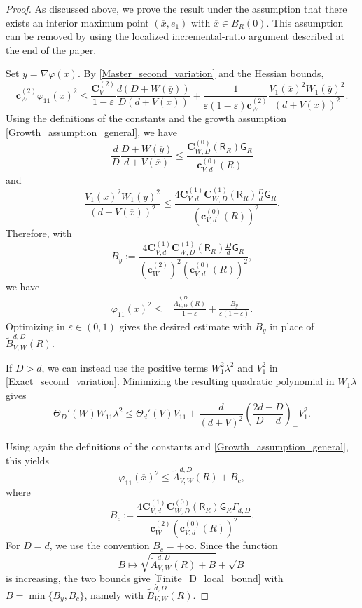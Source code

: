 \documentclass[10pt,a4paper]{amsart}
\newcommand{\CV}{\mathbf{C}_V}
\newcommand{\CVp}[1]{\mathbf{C}_{V,#1}}
\newcommand{\CWp}[1]{\mathbf{C}_{W,#1}}
\newcommand{\ThetaPar}{\Theta}
\newcommand{\cVp}[1]{\mathbf{c}_{V,#1}}
\newcommand{\cW}{\mathbf{c}_W}
\renewcommand{\epsilon}{\varepsilon}
\begin{document}
\begin{proof}
As discussed above, we prove the result under the assumption that there exists an interior  maximum point $(\overline x,e_1)$ with $\overline x\in B_R(0)$. This assumption can be removed by using the localized incremental-ratio argument described at the end of the paper.

Set $\overline y=\nabla\varphi(\overline x)$. By \cref{Master_second_variation} and the Hessian bounds,
\[
\cW^{(2)}\varphi_{11}(\overline x)^2
\le
\frac{\CV^{(2)}}{1-\epsilon}
\frac{d(D+W(\overline y))}{D(d+V(\overline x))} 
+
\frac{1}{\epsilon(1-\epsilon)\cW^{(2)}}
\frac{V_1(\overline x)^2W_1(\overline y)^2}{(d+V(\overline x))^2}.
\]
Using the definitions of the constants and the growth assumption \cref{Growth_assumption_general}, we have
\[
    \frac{d}{D}\frac{D+W(\overline y)}{d+V(\overline x)}
    \le
    \frac{\CWp{D}^{(0)}(\mathsf R_R)\mathsf G_R}{\cVp{d}^{(0)}(R)}
\]
and
\[
    \frac{V_1(\overline x)^2W_1(\overline y)^2}{(d+V(\overline x))^2}
    \le
    \frac{4\CVp{d}^{(1)}\CWp{D}^{(1)}(\mathsf R_R)\frac{D}{d}\mathsf G_R}{(\cVp{d}^{(0)}(R))^2}.
\]
Therefore, with
\[
    B_y:=
    \frac{4\CVp{d}^{(1)}\CWp{D}^{(1)}(\mathsf R_R)\frac{D}{d}\mathsf G_R}
    {(\cW^{(2)})^2(\cVp{d}^{(0)}(R))^2},
\]
we have
\[
    \begin{aligned}
    \varphi_{11}(\overline x)^2
    \le{}&
    \frac{\widetilde A_{V,W}^{d,D}(R)}{1-\epsilon}
    +
    \frac{B_y}{\epsilon(1-\epsilon)}.
    \end{aligned}
\]
Optimizing in $\epsilon\in(0,1)$ gives the desired estimate with $B_y$ in place of $\widetilde B_{V,W}^{d,D}(R)$.

If $D>d$, we can instead use the positive terms $W_1^2\lambda^2$ and $V_1^2$ in \cref{Exact_second_variation}. Minimizing the resulting quadratic polynomial in $W_1\lambda$ gives
\[
    \ThetaPar_D'(W)W_{11}\lambda^2
    \le
    \ThetaPar_d'(V)V_{11}
    +
    \frac{d}{(d+V)^2}
    \left(\frac{2d-D}{D-d}\right)_+
    V_1^2.
\]





Using again the definitions of the constants and \cref{Growth_assumption_general}, this yields
\[
    \varphi_{11}(\overline x)^2
    \le
    \widetilde A_{V,W}^{d,D}(R)
    +
    B_c,
\]
where
\[
    B_c:=
    \frac{4\CVp{d}^{(1)}\CWp{D}^{(0)}(\mathsf R_R)\mathsf G_R\Gamma_{d,D}}
    {\cW^{(2)}(\cVp{d}^{(0)}(R))^2}.
\]
For $D=d$, we use the convention $B_c=+\infty$. Since the function
\[
    B\mapsto \sqrt{\widetilde A_{V,W}^{d,D}(R)+B}+\sqrt B
\]
is increasing, the two bounds give \cref{Finite_D_local_bound} with $B=\min\{B_y,B_c\}$, namely with $\widetilde B_{V,W}^{d,D}(R)$.
\end{proof}
\end{document}
